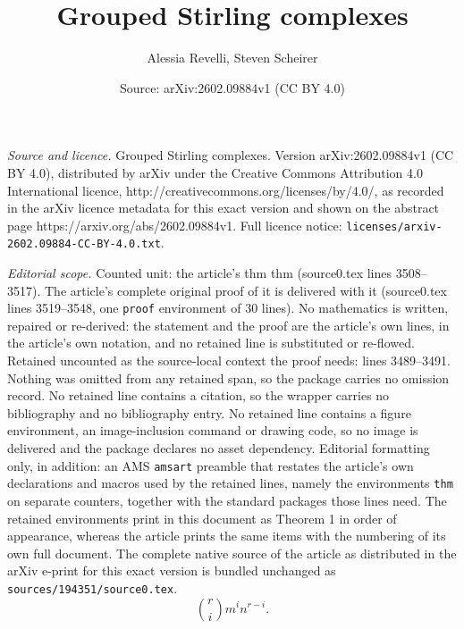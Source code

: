 \documentclass[10pt,a4paper]{amsart}
\title{Grouped Stirling complexes}
\author{Alessia Revelli, Steven Scheirer}
\date{Source: arXiv:2602.09884v1 (CC BY 4.0)}
\newtheorem{thm}{Theorem}
\newcommand{\Sr}{S_{\vec{r}}}
\newcommand{\Z}{\mathbb{Z}}
\begin{document}
\maketitle

\noindent\emph{Source and licence.} Grouped Stirling complexes. Version arXiv:2602.09884v1 (CC BY 4.0), distributed by arXiv under the Creative Commons Attribution 4.0 International licence, http://creativecommons.org/licenses/by/4.0/, as recorded in the arXiv licence metadata for this exact version and shown on the abstract page https://arxiv.org/abs/2602.09884v1. Full licence notice: \texttt{licenses/arxiv-2602.09884-CC-BY-4.0.txt}.\par\smallskip

\noindent\textit{Editorial scope.} Counted unit: the article's thm thm (source0.tex lines 3508--3517). The article's complete original proof of it is delivered with it (source0.tex lines 3519--3548, one \texttt{proof} environment of 30 lines). No mathematics is written, repaired or re-derived: the statement and the proof are the article's own lines, in the article's own notation, and no retained line is substituted or re-flowed.  Retained uncounted as the source-local context the proof needs: lines 3489--3491.  Nothing was omitted from any retained span, so the package carries no omission record.  No retained line contains a citation, so the wrapper carries no bibliography and no bibliography entry.  No retained line contains a figure environment, an image-inclusion command or drawing code, so no image is delivered and the package declares no asset dependency.  Editorial formatting only, in addition: an AMS \texttt{amsart} preamble that restates the article's own declarations and macros used by the retained lines, namely the environments \texttt{thm} on separate counters, together with the standard packages those lines need.  The retained environments print in this document as Theorem 1 in order of appearance, whereas the article prints the same items with the numbering of its own full document.  The complete native source of the article as distributed in the arXiv e-print for this exact version is bundled unchanged as \texttt{sources/194351/source0.tex}.
\begin{equation}\label{eqn:total}
    \binom{r}{i} m^in^{r-i}.
\end{equation}

\end{document}
